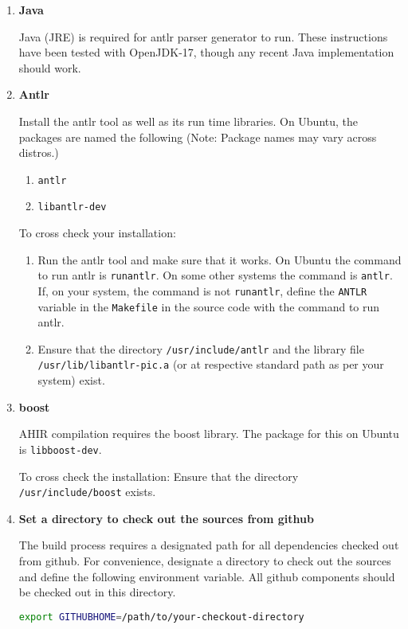 \documentclass[12pt,a4paper]{article}
\begin{document}
\begin{enumerate}
\item \textbf{Java}

Java (JRE) is required for antlr parser generator to run. These instructions have been tested with OpenJDK-17, though any recent Java implementation should work.

\item \textbf{Antlr}

Install the antlr tool as well as its run time libraries. On Ubuntu, the packages are named the following (Note: Package names may vary across distros.)

\begin{enumerate}
\item \texttt{antlr}
\item \texttt{libantlr-dev}
\end{enumerate}

To cross check your installation:

\begin{enumerate}
\item Run the antlr tool and make sure that it works. On Ubuntu the command to run antlr is \texttt{runantlr}. On some other systems the command is \texttt{antlr}. If, on your system, the command is not \texttt{runantlr}, define the \texttt{ANTLR} variable in the \texttt{Makefile} in the source code with the command to run antlr.

\item Ensure that the directory \texttt{/usr/include/antlr} and the library file \texttt{/usr/lib/libantlr-pic.a} (or at respective standard path as per your system) exist.
\end{enumerate}

\item \textbf{boost}

AHIR compilation requires the boost library. The package for this on Ubuntu is \texttt{libboost-dev}.

To cross check the installation: Ensure that the directory \texttt{/usr/include/boost} exists.

\item \textbf{Set a directory to check out the sources from github}

The build process requires a designated path for all dependencies checked out from github. For convenience, designate a directory to check out the sources and define the following environment variable. All github components should be checked out in this directory.

\begin{lstlisting}[language=bash,style=snippet]
export GITHUBHOME=/path/to/your-checkout-directory
\end{lstlisting}


\end{enumerate}
\end{document}
